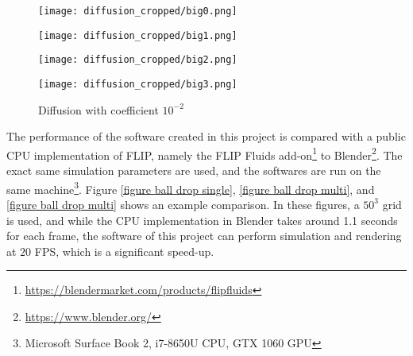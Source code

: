 \begin{figure}[H]
    \centering
    
    \begin{minipage}[t]{.24\linewidth}
        \centering
        \vspace{0pt}
        \texttt{[image: diffusion\_cropped/big0.png]}
    \end{minipage}
    \begin{minipage}[t]{.24\linewidth}
        \centering
        \vspace{0pt}
        \texttt{[image: diffusion\_cropped/big1.png]}
    \end{minipage}
    \begin{minipage}[t]{.24\linewidth}
        \centering
        \vspace{0pt}
        \texttt{[image: diffusion\_cropped/big2.png]}
    \end{minipage}
    \begin{minipage}[t]{.24\linewidth}
        \centering
        \vspace{0pt}
        \texttt{[image: diffusion\_cropped/big3.png]}
    \end{minipage}

    \caption{Diffusion with coefficient $10^{-2}$}
    \label{fig diffusion 1e-2}
\end{figure}



The performance of the software created in this project is compared with a public CPU implementation of FLIP, namely the FLIP Fluids add-on\footnote{\url{https://blendermarket.com/products/flipfluids}} to Blender\footnote{\url{https://www.blender.org/}}. The exact same simulation parameters are used, and the softwares are run on the same machine\footnote{Microsoft Surface Book 2, i7-8650U CPU, GTX 1060 GPU }. Figure \ref{figure ball drop single}, \ref{figure ball drop multi}, and \ref{figure ball drop multi} shows an example comparison. In these figures, a $50^3$ grid is used, and while the CPU implementation in Blender takes around 1.1 seconds for each frame, the software of this project can perform simulation and rendering at $20$ FPS, which is a significant speed-up.

\gapM
\gapM
\gapM

